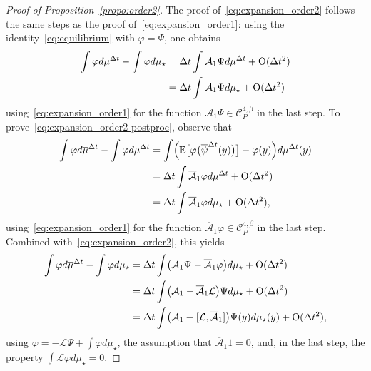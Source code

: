 \documentclass[11pt]{amsart}
\newcommand{\E}{\mathbb{E}}
\begin{document}
\begin{proof}[Proof of Proposition~\ref{propo:order2}]
The proof of~\eqref{eq:expansion_order2} follows the same steps as the proof of~\eqref{eq:expansion_order1}: using the identity~\eqref{eq:equilibrium} with $\varphi=\Psi$, one obtains
\begin{align*}
\int\varphi d\mu^{\Delta t}-\int\varphi d\mu_\star&=\Delta t\int\mathcal{A}_1\Psi d\mu^{\Delta t}+{\rm O}(\Delta t^2)\\
&=\Delta t\int\mathcal{A}_1\Psi d\mu_\star+{\rm O}(\Delta t^2)
\end{align*}
using~\eqref{eq:expansion_order1} for the function $\mathcal{A}_1\Psi\in\mathcal{C}^{4,\beta}_P$ in the last step.
%
To prove~\eqref{eq:expansion_order2-postproc}, observe that
\begin{align*}
\int \varphi d\overline{\mu}^{\Delta t}-\int\varphi d\mu^{\Delta t}&=\int \Bigl(\E\bigl[\varphi\bigl(\overline{\psi}^{\Delta t}(y)\bigr)\bigr]-\varphi(y)\Bigr)d\mu^{\Delta t}(y)\\
&=\Delta t\int \overline{\mathcal{A}}_1\varphi d\mu^{\Delta t}+{\rm O}(\Delta t^2)\\
&=\Delta t\int \overline{\mathcal{A}}_1\varphi d\mu_\star+{\rm O}(\Delta t^2),
\end{align*}
using~\eqref{eq:expansion_order1} for the function $\overline{\mathcal{A}}_1\varphi\in\mathcal{C}^{4,\beta}_P$ in the last step.
%
Combined with~\eqref{eq:expansion_order2}, this yields
\begin{align*}
\int\varphi d\overline{\mu}^{\Delta t}-\int\varphi d\mu_\star&=\Delta t\int \bigl(\mathcal{A}_1\Psi-\overline{\mathcal{A}}_1\varphi\bigr)d\mu_\star+{\rm O}(\Delta t^2)\\
&=\Delta t\int \bigl(\mathcal{A}_1-\overline{\mathcal{A}}_1\mathcal{L}\bigr)\Psi d\mu_\star+{\rm O}(\Delta t^2)\\
&=\Delta t\int \bigl(\mathcal{A}_1+[\mathcal{L},\overline{\mathcal{A}}_1]\bigr)\Psi(y)d\mu_\star(y)+{\rm O}(\Delta t^2),
\end{align*}
using $\varphi=-\mathcal{L}\Psi+\int\varphi d\mu_\star$, the assumption that $\overline{\mathcal{A}}_1 1=0$, and, in the last step, the property $\int \mathcal{L}\varphi d\mu_\star=0$.
\end{proof}
\end{document}
